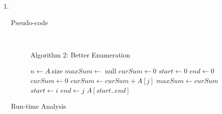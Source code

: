 \documentclass[paper=a4, fontsize=11pt]{scrartcl} %
\numberwithin{equation}{section} %
\numberwithin{figure}{section} %
\numberwithin{table}{section} %
\begin{document}
\begin{enumerate}[label=\bfseries Algorithm \arabic*:]
    \item \hfill \\
    \begin{description}
        \item[Pseudo-code] \hfill \\
        \begin{algorithmc}
            \caption{Algorithm 2: Better Enumeration}
                \State $n \gets A$.size
                \State $maxSum \gets$ null
                \State $curSum \gets 0$
                \State $start \gets 0$
                \State $end \gets 0$
                    \State $curSum \gets 0$
                        \State $curSum \gets curSum + A[j]$
                            \State $maxSum \gets curSum$
                            \State $start \gets i$
                            \State $end \gets j$
                        \EndIf
                    \EndFor
                \EndFor
                \State \Return $A[start..end]$
            \EndFunction
        \end{algorithmc}
        \item[Run-time Analysis] \hfill \\
    \end{description}


\end{enumerate}
\end{document}
